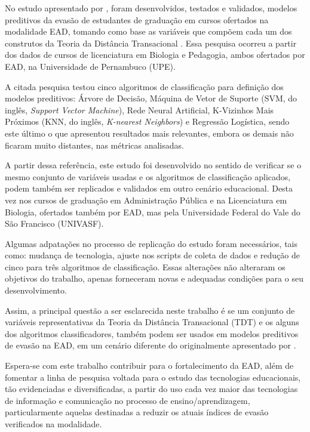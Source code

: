 No estudo apresentado por , foram desenvolvidos,
testados e validados, modelos preditivos da evasão de estudantes de graduação em
cursos ofertados na modalidade EAD, tomando como base as variáveis que compõem
cada um dos construtos da Teoria da Distância Transacional
\cite{moore2008teoria}. Essa pesquisa ocorreu a partir dos dados de cursos de
licenciatura em Biologia e Pedagogia, ambos ofertados por EAD, na Universidade
de Pernambuco (UPE).

A citada pesquisa testou cinco algoritmos de classificação para definição dos
modelos preditivos: Árvore de Decisão, Máquina de Vetor de Suporte (SVM, do inglês, \textit{Support Vector Machine}), Rede
Neural Artificial, K-Vizinhos Mais Próximos (KNN, do inglês, \textit{K-nearest
Neighbors}) e Regressão Logística, sendo este último o que apresentou resultados
mais relevantes, embora os demais não ficaram muito distantes, nas métricas
analisadas.

A partir dessa referência, este estudo foi desenvolvido no sentido de verificar
se o mesmo conjunto de variáveis usadas e os algoritmos de classificação
aplicados, podem também ser replicados e validados em outro cenário educacional.
Desta vez nos cursos de graduação em Administração Pública e na Licenciatura em
Biologia, ofertados também por EAD, mas pela Universidade Federal do Vale do São
Francisco (UNIVASF).

Algumas adpatações no processo de replicação do estudo foram necessários, tais
como: mudança de tecnologia, ajuste nos scripts de coleta de dados e redução de
cinco para três algoritmos de classificação. Essas alterações não alteraram os
objetivos do trabalho, apenas forneceram novas e adequadas condições para o seu
desenvolvimento.

Assim, a principal questão a ser esclarecida neste trabalho é se um conjunto de
variáveis representativas da Teoria da Distância Transacional (TDT) e os alguns
dos algoritmos classificadores, também podem ser usados em modelos preditivos de
evasão na EAD, em um cenário diferente do originalmente apresentado por
.

Espera-se com este trabalho contribuir para o fortalecimento da EAD, além de
fomentar a linha de pesquisa voltada para o estudo das tecnologias educacionais,
tão evidenciadas e diversificadas, a partir do uso cada vez maior das
tecnologias de informação e comunicação no processo de ensino/aprendizagem,
particularmente aquelas destinadas a reduzir os atuais índices de evasão
verificados na modalidade.

